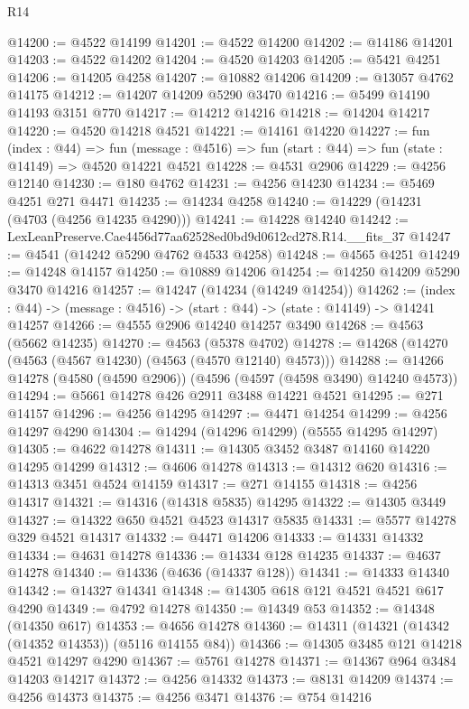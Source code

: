 \begin{lexlean}{R14}
\begin{coremodule}
@14200 := @4522 @14199
@14201 := @4522 @14200
@14202 := @14186 @14201
@14203 := @4522 @14202
@14204 := @4520 @14203
@14205 := @5421 @4251
@14206 := @14205 @4258
@14207 := @10882 @14206
@14209 := @13057 @4762 @14175
@14212 := @14207 @14209 @5290 @3470
@14216 := @5499 @14190 @14193 @3151 @770
@14217 := @14212 @14216
@14218 := @14204 @14217
@14220 := @4520 @14218 @4521
@14221 := @14161 @14220
@14227 := fun (index : @44) =>
  fun (message : @4516) => fun (start : @44) => fun (state : @14149) => @4520 @14221 @4521
@14228 := @4531 @2906
@14229 := @4256 @12140
@14230 := @180 @4762
@14231 := @4256 @14230
@14234 := @5469 @4251 @271 @4471
@14235 := @14234 @4258
@14240 := @14229 (@14231 (@4703 (@4256 @14235 @4290)))
@14241 := @14228 @14240
@14242 := LexLeanPreserve.Cae4456d77aa62528ed0bd9d0612cd278.R14.__fits_37
@14247 := @4541 (@14242 @5290 @4762 @4533 @4258)
@14248 := @4565 @4251
@14249 := @14248 @14157
@14250 := @10889 @14206
@14254 := @14250 @14209 @5290 @3470 @14216
@14257 := @14247 (@14234 (@14249 @14254))
@14262 := (index : @44) -> (message : @4516) -> (start : @44) -> (state : @14149) -> @14241 @14257
@14266 := @4555 @2906 @14240 @14257 @3490
@14268 := @4563 (@5662 @14235)
@14270 := @4563 (@5378 @4702)
@14278 := @14268 (@14270 (@4563 (@4567 @14230) (@4563 (@4570 @12140) @4573)))
@14288 := @14266 @14278 (@4580 (@4590 @2906)) (@4596 (@4597 (@4598 @3490) @14240 @4573))
@14294 := @5661 @14278 @426 @2911 @3488 @14221 @4521
@14295 := @271 @14157
@14296 := @4256 @14295
@14297 := @4471 @14254
@14299 := @4256 @14297 @4290
@14304 := @14294 (@14296 @14299) (@5555 @14295 @14297)
@14305 := @4622 @14278
@14311 := @14305 @3452 @3487 @14160 @14220 @14295 @14299
@14312 := @4606 @14278
@14313 := @14312 @620
@14316 := @14313 @3451 @4524 @14159
@14317 := @271 @14155
@14318 := @4256 @14317
@14321 := @14316 (@14318 @5835) @14295
@14322 := @14305 @3449
@14327 := @14322 @650 @4521 @4523 @14317 @5835
@14331 := @5577 @14278 @329 @4521 @14317
@14332 := @4471 @14206
@14333 := @14331 @14332
@14334 := @4631 @14278
@14336 := @14334 @128 @14235
@14337 := @4637 @14278
@14340 := @14336 (@4636 (@14337 @128))
@14341 := @14333 @14340
@14342 := @14327 @14341
@14348 := @14305 @618 @121 @4521 @4521 @617 @4290
@14349 := @4792 @14278
@14350 := @14349 @53
@14352 := @14348 (@14350 @617)
@14353 := @4656 @14278
@14360 := @14311 (@14321 (@14342 (@14352 @14353)) (@5116 @14155 @84))
@14366 := @14305 @3485 @121 @14218 @4521 @14297 @4290
@14367 := @5761 @14278
@14371 := @14367 @964 @3484 @14203 @14217
@14372 := @4256 @14332
@14373 := @8131 @14209
@14374 := @4256 @14373
@14375 := @4256 @3471
@14376 := @754 @14216

\end{coremodule}
\end{lexlean}
